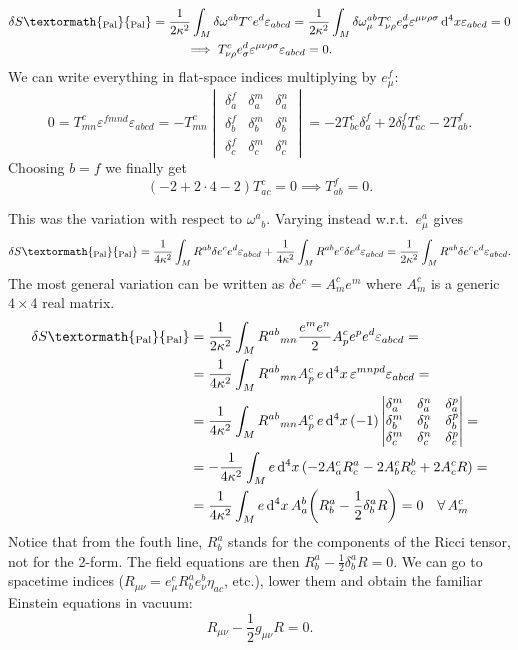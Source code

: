\documentclass[a4paper,12pt]{book}
\newcommand{\ped}[1]{\textormath{\textsubscript{#1}}{_{\mathrm{#1}}}}
\newcommand{\dd}{\mathop{\mathrm{d}\!}{}}
\theoremstyle{definition}
\theoremstyle{remark}
\begin{document}
\begin{gather*}\delta S\ped{Pal}=\frac{1}{2\kappa^2}\int_M\delta\omega^{ab}T^ce^d\varepsilon_{abcd}=\frac{1}{2\kappa^2}\int_M\delta\omega_\mu^{ab}T_{\nu\rho}^ce^d_\sigma\varepsilon^{\mu\nu\rho\sigma}\dd^4x\varepsilon_{abcd}=0\\
\implies T_{\nu\rho}^ce^d_\sigma\varepsilon^{\mu\nu\rho\sigma}\varepsilon_{abcd}=0.
\end{gather*}
We can write everything in flat-space indices multiplying by $e^f_\mu$:
\[0=T^c_{mn}\varepsilon^{fmnd}\varepsilon_{abcd}=-T^c_{mn}
\begin{vmatrix}
\delta^f_a & \delta^m_a & \delta^n_a \\
\delta^f_b & \delta^m_b & \delta^n_b \\
\delta^f_c & \delta^m_c & \delta^n_c
\end{vmatrix}
=-2T^c_{bc}\delta^f_a+2\delta^f_bT^c_{ac}-2T^f_{ab}.
\]
Choosing $b=f$ we finally get
\[(-2+2\cdot4-2)T^c_{ac}=0\implies T^f_{ab}=0.\]

This was the variation with respect to $\omega^a{}_b$. Varying instead w.r.t.~$e^a_\mu$ gives
\[\delta S\ped{Pal}=\frac{1}{4\kappa^2}\int_MR^{ab}\delta e^ce^d\varepsilon_{abcd}+\frac{1}{4\kappa^2}\int_MR^{ab} e^c\delta e^d\varepsilon_{abcd}=\frac{1}{2\kappa^2}\int_MR^{ab}\delta e^ce^d\varepsilon_{abcd}.\]
The most general variation can be written as $\delta e^c=A^c_me^m$ where $A^c_m$ is a generic $4\times4$ real matrix.
\begin{align*}
\delta S\ped{Pal}&=\frac{1}{2\kappa^2}\int_MR^{ab}{}_{mn}\frac{e^me^n}{2}A^c_pe^pe^d\varepsilon_{abcd}=\\
&=\frac{1}{4\kappa^2}\int_MR^{ab}{}_{mn}A^c_p\,e\dd^4x\,\varepsilon^{mnpd}\varepsilon_{abcd}=\\
&=\frac{1}{4\kappa^2}\int_MR^{ab}{}_{mn}A^c_p\,e\dd^4x\,(-1)
\begin{vmatrix}
\delta^m_a & \delta^n_a & \delta^p_a \\
\delta^m_b & \delta^n_b & \delta^p_b \\
\delta^m_c & \delta^n_c & \delta^p_c
\end{vmatrix}=\\
&=-\frac{1}{4\kappa^2}\int_Me\dd^4x\,(-2A^c_aR^a_c-2A^c_bR^b_c+2A^c_cR)=\\
&=\frac{1}{4\kappa^2}\int_Me\dd^4x\,A^b_a\biggl(R^a_b-\frac{1}{2}\delta^a_bR\biggr)=0\quad\forall\,A^c_m\\
\end{align*}
Notice that from the fouth line, $R^a_b$ stands for the components of the Ricci tensor, not for the 2-form. The field equations are then $R^a_b-\frac{1}{2}\delta^a_bR=0$. We can go to spacetime indices ($R_{\mu\nu}=e^c_\mu R^a_be^b_\nu\eta_{ac}$, etc.), lower them and obtain the familiar Einstein equations in vacuum:
\[R_{\mu\nu}-\frac{1}{2}g_{\mu\nu}R=0.\]
\end{document}

